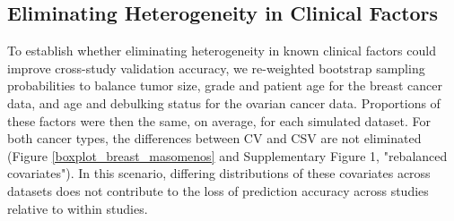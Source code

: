 \documentclass{bioinfo}
\begin{document}
  \subsection{Eliminating Heterogeneity in Clinical Factors}


  To establish whether eliminating heterogeneity in known clinical
  factors could improve cross-study validation accuracy, we
  re-weighted bootstrap sampling probabilities to balance tumor size,
  grade and patient age for the breast cancer data, and age and 
  debulking status for the ovarian cancer data. Proportions of these factors
  were then the same, on average, for each simulated dataset. 
  For both cancer types, the differences between CV and CSV are not eliminated 
  (Figure \ref{boxplot_breast_masomenos} and Supplementary Figure 1, "rebalanced covariates"). In this scenario, differing distributions of these
  covariates across datasets does not contribute to the loss of
  prediction accuracy across studies relative to within studies.
\end{document}
